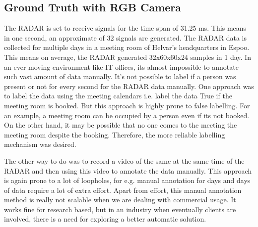 \subsection{Ground Truth with RGB Camera}
\label{section:environments}
The RADAR is set to receive signals for the time span of 31.25 ms. This means in one second, an approximate of 32 signals are generated. The RADAR data is collected for multiple days in a meeting room of Helvar's headquarters in Espoo. This means on average, the RADAR generated 32x60x60x24 samples in 1 day. In an ever-moving environment like IT offices, its almost impossible to annotate such vast amount of data manually. It's not possible to label if a person was present or not for every second for the RADAR data manually.  One approach was to label the data using the meeting calendars i.e. label the data True if the meeting room is booked. But this approach is highly prone to false labelling. For an example, a meeting room can be occupied by a person even if its not booked. On the other hand, it may be possible that no one comes to the meeting the meeting room despite the booking. Therefore, the more reliable labelling mechanism was desired.

The other way to do was to record a video of the same at the same time of the RADAR and then using this video to annotate the data manually. This approach is again prone to a lot of loopholes, for e.g. manual annotation for days and days of data require a lot of extra effort. Apart from effort, this manual annotation method is really not scalable when we are dealing with commercial usage. It works fine for research based, but in an industry when eventually clients are involved, there is a need for exploring a better automatic solution. 

